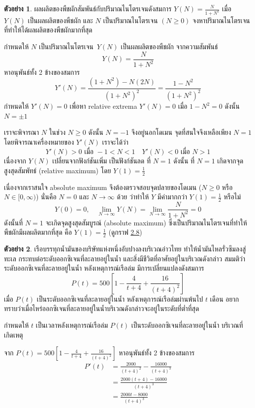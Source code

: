 \documentclass[
]{book}
\theoremstyle{definition}
\theoremstyle{definition}
\newtheorem{example}{ตัวอย่าง}[chapter]
\theoremstyle{definition}
\theoremstyle{definition}
\theoremstyle{remark}
\begin{document}
\begin{example}
ผลผลิตของพืชผักสัมพันธ์กับปริมาณไนโตรเจนดังสมการ
\(\displaystyle Y(N)= \frac{N}{1+N^2}\) เมื่อ \(Y(N)\) เป็นผลผลิตของพืชผัก และ \(N\)
เป็นปริมาณไนโตรเจน \((N \ge 0)\) จงหาปริมาณไนโตรเจนที่ทำให้ได้ผลผลิตของพืชผักมากที่สุด
\end{example}

กำหนดให้ \(N\) เป็นปริมาณไนโตรเจน~\(Y(N)\) เป็นผลผลิตของพืชผัก จากความสัมพันธ์
\[Y(N)= \frac{N}{1+N^2}\] หาอนุพันธ์ทั้ง 2 ข้างของสมการ
\[Y'(N)= \frac{(1+N^2)-N(2N)}{(1+N^2)^2}= \frac{1-N^2}{(1+N^2)^2}\]
กำหนดให้ \(Y'(N)=0\) เพื่อหา relative extrema \(Y'(N)=0\) เมื่อ \(1-N^2=0\) ดังนั้น
\(N= \pm 1\)

เราจะพิจารณา \(N\) ในช่วง \(N \ge 0\) ดังนั้น \(N=-1\) จึงอยู่นอกโดเมน
จุดที่สนใจจึงเหลือเพียง \(N=1\) โดยพิจารณาเครื่องหมายของ \(Y'(N)\) เราจะได้ว่า
\[Y'(N) > 0 \text{ เมื่อ }  -1< N <1  \quad  Y'(N) < 0 \text{ เมื่อ } N > 1\]
เนื่องจาก \(Y(N)\) เปลี่ยนจากฟังก์ชันเพิ่ม เป็นฟังก์ชันลด ที่ \(N=1\) ดังนั้น ที่ \(N=1\)
เกิดจากจุดสูงสุดสัมพัทธ์ (relative maximum) โดย \(Y(1)= \frac{1}{2}\)

เนื่องจากเราสนใจ absolute maximum จึงต้องตรวจสอบจุดปลายของโดเมน (\(N \ge 0\)
หรือ \(N \in [0,\infty)\)) นั่นคือ \(N=0\) และ \(N \rightarrow \infty\) ด้วย ว่าทำให้
\(Y\) มีค่ามากกว่า \(Y(1)= \frac{1}{2}\) หรือไม่
\[Y(0)=0,   \quad  \lim_{N \rightarrow \infty} Y(N) =\lim_{N \rightarrow \infty} \frac{N}{1+N^2} = 0\]
ดังนั้นที่ \(N=1\) จะเกิดจุดสูงสุดสัมบูรณ์ (absolute maximum)
ซึ่งเป็นปริมาณไนโตรเจนที่ทำให้พืชผักมีผลผลิตมากที่สุด คือ \(Y(1)= \frac{1}{2}\) (ดูกราฟ
\hyperref[fig-nitrogen]{2.8})

\begin{example}
เรือบรรทุกน้ำมันของบริษัทแห่งหนึ่งอับปางลงบริเวณอ่าวไทย ทำให้น้ำมันไหลรั่วซึมลงสู่ทะเล
กระทบต่อระดับออกซิเจนที่ละลายอยู่ในน้ำ และสิ่งมีชีวิตที่อาศัยอยู่ในบริเวณดังกล่าว
สมมติว่าระดับออกซิเจนที่ละลายอยู่ในน้ำ หลังเหตุการณ์เรือล่ม มีการเปลี่ยนแปลงดังสมการ
\[P(t)=500[1- \frac{4}{t+4} + \frac{16}{(t+4)^2}]\] เมื่อ \(P(t)\)
เป็นระดับออกซิเจนที่ละลายอยู่ในน้ำ หลังเหตุการณ์เรือล่มผ่านพ้นไป \(t\) เดือน
อยากทราบว่าเมื่อไหร่ออกซิเจนที่ละลายอยู่ในน้ำบริเวณดังกล่าวจะอยู่ในระดับที่ต่ำที่สุด
\end{example}

กำหนดให้ \(t\) เป็นเวลาหลังเหตุการณ์เรือล่ม \(P(t)\) เป็นระดับออกซิเจนที่ละลายอยู่ในน้ำ
บริเวณที่เกิดเหตุ

จาก \(P(t)=500[1- \frac{4}{t+4} + \frac{16}{(t+4)^2}]\) หาอนุพันธ์ทั้ง 2
ข้างของสมการ \begin{equation}   \begin{aligned}
    P'(t) &= \frac{2000}{(t+4)^2} - \frac{16000}{(t+4)^3} \\
          &=\frac{2000(t+4)-16000}{(t+4)^3} \\
          &=\frac{2000t-8000}{(t+4)^3}
  \end{aligned} \end{equation}
\end{document}
